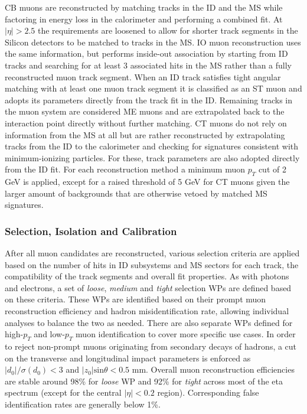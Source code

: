 CB muons are reconstructed by matching tracks in the ID and the MS while factoring in energy loss in the calorimeter and 
performing a combined fit. At $|\eta| > 2.5$ the requirements are loosened to allow for shorter track segments in the Silicon 
detectors to be matched to tracks in the MS. IO muon reconstruction uses the same information, but performs inside-out 
association by starting from ID tracks and searching for at least 3 associated hits in the MS rather than a fully reconstructed 
muon track segment. When an ID track satisfies tight angular matching with at least one muon track segment it is classified as 
an ST muon and adopts its parameters directly from the track fit in the ID. Remaining tracks in the muon system are considered 
ME muons and are extrapolated back to the interaction point directly without further matching. CT muons do not rely on 
information from the MS at all but are rather reconstructed by extrapolating tracks from the ID to the calorimeter and checking 
for signatures consistent with minimum-ionizing particles. For these, track parameters are also adopted directly from the ID fit. 
For each reconstruction method a minimum muon $p_T$ cut of 2 GeV is applied, except for a raised threshold of 5 GeV for CT muons 
given the larger amount of backgrounds that are otherwise vetoed by matched MS signatures. \par

\subsubsection*{Selection, Isolation and Calibration}

After all muon candidates are reconstructed, various selection criteria are applied based on the number of hits in ID subsystems 
and MS sectors for each track, the compatibility of the track segments and overall fit properties. As with photons and electrons, 
a set of \textit{loose}, \textit{medium} and \textit{tight} selection WPs are defined based on these criteria. These WPs are 
identified based on their prompt muon reconstruction efficiency and hadron misidentification rate, allowing individual analyses 
to balance the two as needed. There are also separate WPs defined for high-$p_T$ and low-$p_T$ muon identification to cover more 
specific use cases. In order to reject non-prompt muons originating from secondary decays of hadrons, a cut on the transverse and 
longitudinal impact parameters is enforced as $|d_0|/\sigma(d_0) < 3$ and $|z_0|\text{sin}\theta < 0.5$ mm. Overall muon 
reconstruction efficiencies are stable around 98\% for \textit{loose} WP and 92\% for \textit{tight} across most of the eta 
spectrum (except for the central $|\eta| < 0.2$ region). Corresponding false identification rates are generally below 1\%. \par

